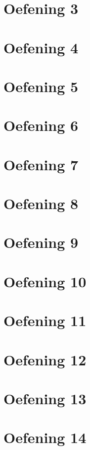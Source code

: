 \documentclass[a4paper,11pt]{report}
\begin{document}
\section{Oefening 3}

\section{Oefening 4}

\section{Oefening 5}

\section{Oefening 6}

\section{Oefening 7}

\section{Oefening 8}

\section{Oefening 9}

\section{Oefening 10}

\section{Oefening 11}

\section{Oefening 12}

\section{Oefening 13}

\section{Oefening 14}

\end{document}
